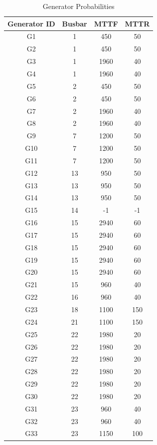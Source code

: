 \documentclass[a4paper,oneside,12pt]{report}
\begin{document}
\begin{table}[htbp]
\caption{Generator Probabilities}
\label{table_gen}
\centering
\begin{tabular}{c||c||c||c}
\bfseries Generator ID & \bfseries Busbar & \bfseries MTTF & \bfseries MTTR \\
\hline \hline
G1 & 1 & 450 & 50 \\
G2 & 1 & 450 & 50 \\
G3 & 1 & 1960 & 40 \\
G4 & 1 & 1960 & 40 \\
G5 & 2 & 450 & 50 \\
G6 & 2 & 450 & 50 \\
G7 & 2 & 1960 & 40 \\
G8 & 2 & 1960 & 40 \\
G9 & 7 & 1200 & 50 \\
G10 & 7 & 1200 & 50 \\
G11 & 7 & 1200 & 50 \\
G12 & 13 & 950 & 50 \\
G13 & 13 & 950 & 50 \\
G14 & 13 & 950 & 50 \\
G15 & 14 & -1 & -1 \\
G16 & 15 & 2940 & 60 \\
G17 & 15 & 2940 & 60 \\
G18 & 15 & 2940 & 60 \\
G19 & 15 & 2940 & 60 \\
G20 & 15 & 2940 & 60 \\
G21 & 15 & 960 & 40 \\
G22 & 16 & 960 & 40 \\
G23 & 18 & 1100 & 150 \\
G24 & 21 & 1100 & 150 \\
G25 & 22 & 1980 & 20 \\
G26 & 22 & 1980 & 20 \\
G27 & 22 & 1980 & 20 \\
G28 & 22 & 1980 & 20 \\
G29 & 22 & 1980 & 20 \\
G30 & 22 & 1980 & 20 \\
G31 & 23 & 960 & 40 \\
G32 & 23 & 960 & 40 \\
G33 & 23 & 1150 & 100 \\
\hline
\end{tabular}
\end{table}
\end{document}

